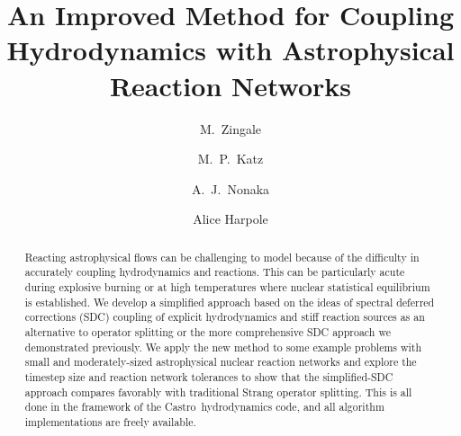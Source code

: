 \documentclass[times,preprint]{aastex63}
\newcommand{\castro}{{\sf Castro}}
\begin{document}
\title{An Improved Method for Coupling Hydrodynamics with Astrophysical Reaction Networks}



\shortauthors{}

\author[0000-0001-8401-030X]{M.~Zingale}

\author[0000-0003-0439-4556]{M.~P.~Katz}

\author[0000-0003-1791-0265]{A.~J.~Nonaka}

\author[0000-0002-1530-781X]{Alice Harpole}



\begin{abstract}
Reacting astrophysical flows can be challenging to model because of
the difficulty in accurately coupling hydrodynamics and reactions.
This can be particularly acute during explosive burning or at high
temperatures where nuclear statistical equilibrium is established.  We
develop a simplified approach based on the ideas of spectral deferred
corrections (SDC) coupling of explicit hydrodynamics and stiff
reaction sources as an alternative to operator splitting or the more
comprehensive SDC approach we demonstrated previously.  We apply the
new method to some example problems with small and moderately-sized
astrophysical nuclear reaction networks and explore the timestep size
and reaction network tolerances to show that the simplified-SDC
approach compares favorably with traditional Strang operator
splitting.  This is all done in the framework of the
\castro\ hydrodynamics code, and all algorithm implementations are
freely available.
\end{abstract}
\end{document}
